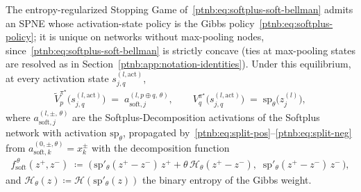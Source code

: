 \begin{theoremenv}\label{ptnb:thm:softplus-forward}\label{prop:softplus_game}
The entropy-regularized Stopping Game of~\eqref{ptnb:eq:softplus-soft-bellman} admits an SPNE whose
activation-state policy is the Gibbs policy~\eqref{ptnb:eq:softplus-policy}; it is unique on networks
without max-pooling nodes, since~\eqref{ptnb:eq:softplus-soft-bellman} is strictly concave (ties at
max-pooling states are resolved as in Section~\ref{ptnb:app:notation-identities}). Under this
equilibrium, at every activation state $s_{j,q}^{(l, \mathrm{act})}$,
\begin{align}\label{ptnb:eq:softplus-spne-tildes}
    \tilde V_p^{\pi^\star}\!\bigl(s_{j,q}^{(l, \mathrm{act})}\bigr)
    \;=\;
    a_{\mathrm{soft},j}^{(l, p \oplus q,\,\theta)},
    \qquad
    V_q^{\pi^\star}\!\bigl(s_{j,q}^{(l, \mathrm{act})}\bigr)
    \;=\;
    \mathrm{sp}_\theta\!\bigl(z_j^{(l)}\bigr),
\end{align}
where $a_{\mathrm{soft},j}^{(l, \pm,\,\theta)}$ are the Softplus-Decomposition activations of the
Softplus network with activation $\mathrm{sp}_\theta$, propagated
by~\eqref{ptnb:eq:split-pos}--\eqref{ptnb:eq:split-neg} from $a_{\mathrm{soft},k}^{(0,\pm,\theta)} = x_k^\pm$
with the decomposition function
\begin{align}\label{ptnb:eq:softplus-decomp}
    f_{\mathrm{soft}}^{\,\theta}(z^+, z^-) \;\coloneqq\; \bigl(\,\mathrm{sp}'_\theta(z^+ - z^-)\, z^+ +
    \theta\, \mathcal{H}_\theta(z^+ - z^-),\;\; \mathrm{sp}'_\theta(z^+ - z^-)\, z^-\,\bigr),
\end{align}
and $\mathcal{H}_\theta(z) \coloneqq \mathcal{H}(\mathrm{sp}'_\theta(z))$ the binary entropy of the
Gibbs weight.
\hfill{}
\end{theoremenv}


